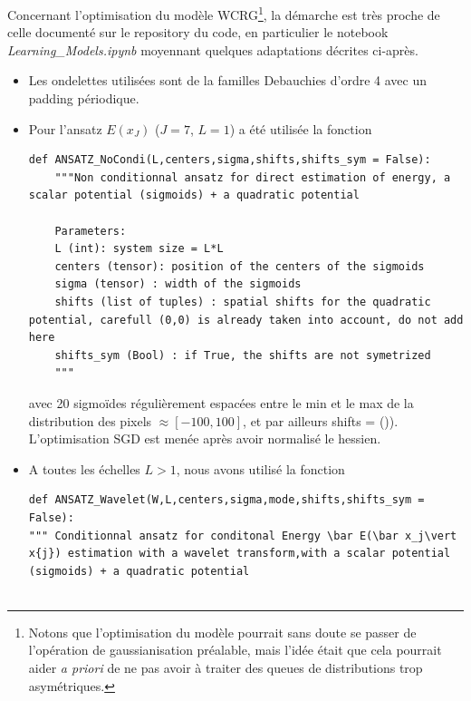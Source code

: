 \documentclass[12pt,twoside]{article}
\newcommand{\itemb}{\item[$\bullet$]}
\begin{document}
Concernant l'optimisation du modèle WCRG\footnote{Notons que l'optimisation du modèle pourrait sans doute se passer de l'opération de gaussianisation préalable, mais l'idée était que cela pourrait aider \textit{a priori} de ne pas avoir à traiter des queues de distributions trop asymétriques.}, la démarche est très proche de celle documenté sur le repository du code, en particulier le notebook \textit{Learning\_Models.ipynb} moyennant quelques adaptations décrites ci-après.
\begin{itemize}
\itemb Les ondelettes utilisées sont de la familles Debauchies d'ordre 4 avec un padding périodique.
\itemb Pour l'ansatz $E(x_J)$ ($J=7$, $L=1$) a été utilisée la fonction 
\begin{lstlisting}[language=iPython]
def ANSATZ_NoCondi(L,centers,sigma,shifts,shifts_sym = False):
    """Non conditionnal ansatz for direct estimation of energy, a scalar potential (sigmoids) + a quadratic potential
    
    Parameters:
    L (int): system size = L*L 
    centers (tensor): position of the centers of the sigmoids 
    sigma (tensor) : width of the sigmoids
    shifts (list of tuples) : spatial shifts for the quadratic potential, carefull (0,0) is already taken into account, do not add here  
    shifts_sym (Bool) : if True, the shifts are not symetrized
    """
\end{lstlisting}
avec 20 sigmoïdes  régulièrement espacées entre le min et le max de la distribution des pixels $\approx [-100,100]$, et par ailleurs \textsf{shifts = ()}). L'optimisation SGD est menée après avoir normalisé le hessien.

\itemb A toutes les échelles $L>1$, nous avons utilisé la fonction 
\begin{lstlisting}[language=iPython]
def ANSATZ_Wavelet(W,L,centers,sigma,mode,shifts,shifts_sym = False):
""" Conditionnal ansatz for conditonal Energy \bar E(\bar x_j\vert x{j}) estimation with a wavelet transform,with a scalar potential (sigmoids) + a quadratic potential
    

\end{lstlisting}
\end{itemize}
\end{document}
